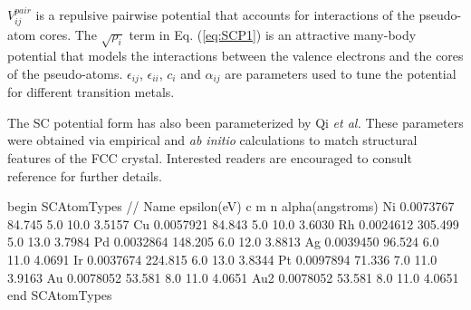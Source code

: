 \documentclass[letterpaper]{report}
\begin{document}
$V^{pair}_{ij}$ is a repulsive pairwise potential that accounts for
interactions of the pseudo-atom cores.  The $\sqrt{\rho_i}$ term in
Eq. (\ref{eq:SCP1}) is an attractive many-body potential that models
the interactions between the valence electrons and the cores of the
pseudo-atoms.  $\epsilon_{ij}$, $\epsilon_{ii}$, $c_i$ and
$\alpha_{ij}$ are parameters used to tune the potential for different
transition metals.

The SC potential form has also been parameterized by Qi {\it et
al.}\cite{Qi99} These parameters were obtained via empirical and {\it
ab initio} calculations to match structural features of the FCC
crystal.  Interested readers are encouraged to consult reference
 for further details.

\begin{code}[caption={[An example of a SCAtomTypes block.] A
simple example of a SCAtomTypes block.  Distances ($\alpha$)
are given in \AA\ and energies ($\epsilon$) are (by convention) given in
units of eV.  These units must be specified in the {\tt Options} block
using the keyword {\tt MetallicEnergyUnitScaling}.  Without this {\tt
Options} keyword, the default units for $\epsilon$ are kcal/mol.  The
other parameters, $m$, $n$, and $c$ are unitless.},
label={sch:SCAtomTypes}]
begin SCAtomTypes
// Name  epsilon(eV)      c      m       n      alpha(angstroms)
Ni      0.0073767       84.745  5.0     10.0    3.5157 
Cu      0.0057921       84.843  5.0     10.0    3.6030
Rh      0.0024612       305.499 5.0     13.0    3.7984
Pd      0.0032864       148.205 6.0     12.0    3.8813
Ag      0.0039450       96.524  6.0     11.0    4.0691
Ir      0.0037674       224.815 6.0     13.0    3.8344  
Pt      0.0097894       71.336  7.0     11.0    3.9163
Au      0.0078052       53.581  8.0     11.0    4.0651
Au2     0.0078052       53.581  8.0     11.0    4.0651
end SCAtomTypes
\end{code}
\end{document}
